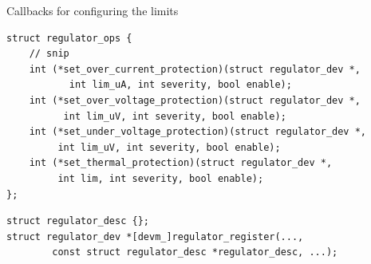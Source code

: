 \documentclass[aspectratio=169]{beamer}
\begin{document}
\begin{frame}[fragile]{Callbacks for configuring the limits}


\lstset{language=C}
\scriptsize
\begin{lstlisting}
struct regulator_ops {
	// snip
	int (*set_over_current_protection)(struct regulator_dev *,
	       int lim_uA, int severity, bool enable);
	int (*set_over_voltage_protection)(struct regulator_dev *,
	      int lim_uV, int severity, bool enable);
	int (*set_under_voltage_protection)(struct regulator_dev *,
	     int lim_uV, int severity, bool enable);
	int (*set_thermal_protection)(struct regulator_dev *,
	     int lim, int severity, bool enable);
};
\end{lstlisting}
\pause

\begin{lstlisting}
struct regulator_desc {};
struct regulator_dev *[devm_]regulator_register(...,
		const struct regulator_desc *regulator_desc, ...);
\end{lstlisting}
\end{frame}

\end{document}
